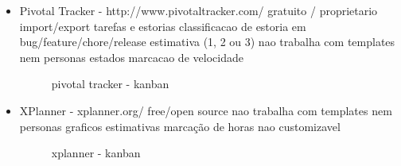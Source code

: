 \begin{itemize}
\item Pivotal Tracker - http://www.pivotaltracker.com/
gratuito / proprietario
import/export tarefas e estorias
classificacao de estoria em bug/feature/chore/release
estimativa (1, 2 ou 3)
nao trabalha com templates nem personas
estados
marcacao de velocidade

\begin{figure}[H]
  \centering
  \caption{pivotal tracker - kanban}
\end{figure}

\item XPlanner - xplanner.org/
free/open source
nao trabalha com templates nem personas
graficos
estimativas
marcação de horas
nao customizavel

\begin{figure}[H]
  \centering
  \caption{xplanner - kanban}
\end{figure}


\end{itemize}
